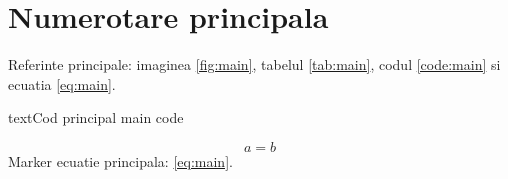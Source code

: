 \documentclass[a4paper,12pt]{report}
\begin{document}
\chapter{Numerotare principala}
Referinte principale: imaginea \ref{fig:main}, tabelul \ref{tab:main}, codul \ref{code:main} si ecuatia \eqref{eq:main}.
\begin{code}{text}{Cod principal}
main code
\end{code}
\begin{equation}
  \label{eq:main}
  a = b
\end{equation}
Marker ecuatie principala: \eqref{eq:main}.
\end{document}
